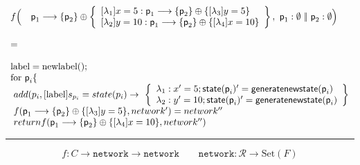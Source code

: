 	
\begin{displaymath}
  \begin{array}{ll}
    f\Big(\quad \textsf{p}_1\longrightarrow\{\textsf{p}_2\} \oplus
    \left\{
    \begin{array}{l}{}
      [\lambda_1] x=5:  \textsf{p}_1\longrightarrow\{\textsf{p}_2\} \oplus\{[\lambda_3] y=5\}
      \\{}
      [\lambda_2] y=10: \textsf{p}_1\longrightarrow\{\textsf{p}_2\} \oplus\{[\lambda_4] x=10\}
    \end{array}
    \right\}
    , \ \textsf{p}_1:\emptyset\ |\!|\ \textsf{p}_2:\emptyset
    \Big)
    \\\\
    =
    \\\\
    \text{label} = \text{newlabel}();\\
    \text{for } \textsf{p}_i \{\\
    \ add(p_i, [\text{label}] {s_{p_i} = state(p_i)} \rightarrow\
    \left\{
    \begin{array}{ll}
      \lambda_1: x'=5; \textsf{state}(\textsf{p}_i)' = \textsf{generatenewstate} (\textsf{p}_i)
      \\
      \lambda_2: y'=10; \textsf{state}(\textsf{p}_i)' = \textsf{generatenewstate} (\textsf{p}_i)
    \end{array}
    \right\}
    \\

    \ f(\textsf{p}_1\longrightarrow\{\textsf{p}_2\} \oplus\{[\lambda_3] y=5\}, network') = network''\\
    \ return f(\textsf{p}_1\longrightarrow\{\textsf{p}_2\} \oplus\{[\lambda_4] x=10\}, network'')
    
  \end{array}
\end{displaymath}

\hrule


\begin{displaymath}
	f : C \longrightarrow \texttt{network} \longrightarrow \texttt{network} \quad\quad \texttt{network} : \mathcal R \longrightarrow \text{Set}(F)
\end{displaymath}

